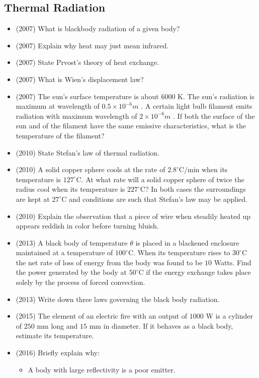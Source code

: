 \documentclass{article}
\begin{document}
\subsection{Thermal Radiation}
\begin{itemize}
\item (2007)  What is blackbody radiation of a given body?
\item (2007)  Explain why heat may just mean infrared.
\item (2007)  State Prvost's theory of heat exchange.
\item (2007)  What is Wien's displacement law?
\item (2007)  The sun's surface temperature is about $ 6000$ K.  The sun's radiation is maximum at wavelength of $ 0.5\times10^{-6}m$ .  A certain light bulb filament emits radiation with maximum wavelength of $ 2\times10^{-6}m$ .  If both the surface of the sun and of the filament have the same emissive characteristics, what is the temperature of the filament?
\item (2010)  State Stefan’s law of thermal radiation.
\item (2010)  A solid copper sphere cools at the rate of $ 2.8^{\circ}$C$/$min when its temperature is $ 127^{\circ}$C. At what rate will a solid copper sphere of twice the radius cool when its temperature is $ 227^{\circ}$C? In both cases the surroundings are kept at $ 27^{\circ}$C and conditions are such that  Stefan’s law may be applied.
\item (2010)  Explain the observation that a piece of wire when steadily heated up appears reddish in color before turning bluish. 
\item (2013)  A black body of temperature $ \theta $ is placed in a blackened enclosure maintained at a temperature of $ 100^{\circ}$C. When its temperature rises to $ 30^{\circ}$C the net rate of loss of energy from the body was found to be $ 10$ Watts. Find the power generated by the body at $ 50^{\circ}$C if the energy exchange takes place solely by the process of forced convection.
\item (2013)  Write down three laws governing the black body radiation.
\item (2015)  The element of an electric fire with an output of $ 1000$ W is a cylinder of $ 250$ mm long and $ 15$ mm in diameter. If it behaves as a black body, estimate its temperature.
\item (2016)  Briefly explain why: \begin{itemize}
\item A body with large reflectivity is a poor emitter. 

\end{itemize}
\end{itemize}
\end{document}
